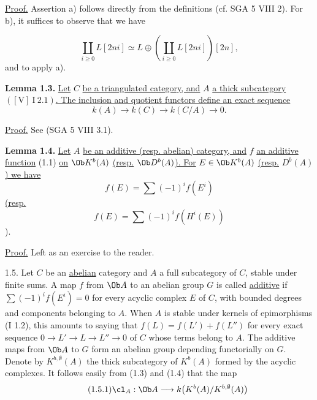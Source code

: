 \uline{Proof.} Assertion a) follows directly from the definitions (cf. SGA 5 VIII 2). For b), it suffices to observe that we have

%
\[
 \coprod_{i\geq0} L[2ni]\simeq
 L\oplus\left(\coprod_{i\geq0}L[2ni]\right)[2n],
\]
and to apply a).

\textbf{Lemma 1.3.} \uline{Let} \(C\) \uline{be a triangulated category, and} \(A\) \uline{a thick subcategory} \(([\mathrm V]\ \mathrm I\ 2.1)\)\uline{. The inclusion and quotient functors define an exact sequence}
\[
 k(A)\longrightarrow k(C)\longrightarrow k(C/A)\longrightarrow 0.
\]

\uline{Proof.} See (SGA 5 VIII 3.1).

\textbf{Lemma 1.4.} \uline{Let} \(A\) \uline{be an additive (resp. abelian) category, and} \(f\) \uline{an additive function} (1.1) \uline{on} \(\Ob K^b(A)\) \uline{(resp.} \(\Ob D^b(A)\)\uline{). For} \(E\in\Ob K^b(A)\) \uline{(resp.} \(D^b(A)\)\uline{) we have}
\[
 f(E)=\sum(-1)^i f(E^i)
\]
\uline{(resp.}
\[
 f(E)=\sum(-1)^i f(H^i(E))
\]).

\uline{Proof.} Left as an exercise to the reader.

1.5. Let \(C\) be an \uline{abelian} category and \(A\) a full subcategory of \(C\), stable under finite sums. A map \(f\) from \(\Ob A\) to an abelian group \(G\) is called \uline{additive} if \(\sum(-1)^i f(E^i)=0\) for every acyclic complex \(E\) of \(C\), with bounded degrees and components belonging to \(A\). When \(A\) is stable under kernels of epimorphisms (I 1.2), this amounts to saying that \(f(L)=f(L')+f(L'')\) for every exact sequence \(0\longrightarrow L'\longrightarrow L\longrightarrow L''\longrightarrow0\) of \(C\) whose terms belong to \(A\). The additive maps from \(\Ob A\) to \(G\) form an abelian group depending functorially on \(G\). Denote by \(K^{b,\emptyset}(A)\) the thick subcategory of \(K^b(A)\) formed by the acyclic complexes. It follows easily from (1.3) and (1.4) that the map
\begin{equation}\tag{1.5.1}
 \cl_A:\Ob A\longrightarrow k\bigl(K^b(A)/K^{b,\emptyset}(A)\bigr)
\end{equation}

